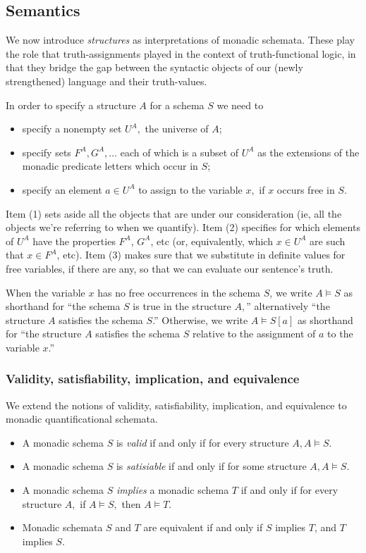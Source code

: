 \subsection{Semantics}

We now introduce \emph{structures} as interpretations of monadic schemata. These play the role that truth-assignments played in the context of truth-functional logic, in that they bridge the gap between the syntactic objects of our (newly strengthened) language and their truth-values.

In order to specify a structure $A$ for a schema $S$ we need to
\begin{itemize}
\item specify a nonempty set $U^A,$ the universe of $A$;
\item specify sets $F^A, G^A, \ldots $ each of which is a subset of $U^A$ as
the extensions of the monadic predicate letters which occur in $S$;
\item specify an element $a \in U^A$ to assign to the variable $x,$ if $x$
occurs free in $S.$ 
\end{itemize}

\begin{aside}
    Item (1) sets aside all the objects that are under our consideration (ie, all the objects we're referring to when we quantify). Item (2) specifies for which elements of $U^A$ have the properties $F^A$, $G^A$, etc (or, equivalently, which $x \in U^A$ are such that $x \in F^A$, etc). Item (3) makes sure that we substitute in definite values for free variables, if there are any, so that we can evaluate our sentence's truth. 
\end{aside}

When the variable $x$ has no free occurrences in the schema $S$, we write $A \models S$ as shorthand for ``the schema $S$ is true in the
structure $A,$'' alternatively ``the structure $A$ satisfies the schema $S$.'' Otherwise, we write $A\models S[a]$ as shorthand for ``the structure $A$ satisfies the schema $S$ relative to the assignment of $a$ to the variable $x$.'' 


\subsubsection*{Validity, satisfiability, implication, and equivalence}

We extend the notions of validity, satisfiability, implication, and equivalence to monadic quantificational schemata.
\begin{itemize}
\item
A monadic schema $S$ is \emph{ valid} if and only if for every structure $A, A
\models S.$
\item
A monadic schema $S$ is \emph{ satisiable} if and only if for some structure $A,
A \models S.$
\item
A monadic schema $S$ \emph{ implies} a monadic schema $T$ if and only if for
every structure $A,$ if $A \models S,$ then $A \models T.$
\item
Monadic schemata $S$ and $T$ are equivalent if and only if $S$ implies $T$, and $T$ implies $S$. 
\end{itemize}

